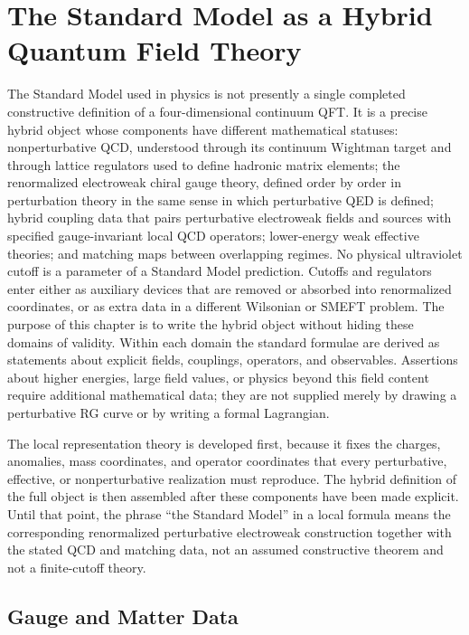 \chapter{The Standard Model as a Hybrid Quantum Field Theory}
\label{ch:standard-model-hybrid}
\ConventionsLorentzian

The Standard Model used in physics is not presently a single completed
constructive definition of a four-dimensional continuum QFT.  It is a precise
hybrid object whose components have different mathematical statuses:
nonperturbative QCD, understood through its continuum Wightman target and
through lattice regulators used to define hadronic matrix elements; the
renormalized electroweak chiral gauge theory, defined order by order in
perturbation theory in the same sense in which perturbative QED is defined;
hybrid coupling data that pairs perturbative electroweak fields and sources
with specified gauge-invariant local QCD operators; lower-energy weak
effective theories; and matching maps between overlapping regimes.  No
physical ultraviolet cutoff is a parameter of a Standard Model prediction.
Cutoffs and regulators enter either as auxiliary devices that are removed or
absorbed into renormalized coordinates, or as extra data in a different
Wilsonian or SMEFT problem.  The purpose of this chapter is to write the
hybrid object without hiding these domains of validity.  Within each domain
the standard formulae are derived as statements about explicit fields,
couplings, operators, and observables.  Assertions about higher energies, large
field values, or physics beyond this field content require additional
mathematical data; they are not supplied merely by drawing a perturbative RG
curve or by writing a formal Lagrangian.

The local representation theory is developed first, because it fixes the
charges, anomalies, mass coordinates, and operator coordinates that every
perturbative, effective, or nonperturbative realization must reproduce.  The
hybrid definition of the full object is then assembled after these components
have been made explicit.  Until that point, the phrase ``the Standard Model''
in a local formula means the corresponding renormalized perturbative
electroweak construction together with the stated QCD and matching data, not an
assumed constructive theorem and not a finite-cutoff theory.

\section{Gauge and Matter Data}


